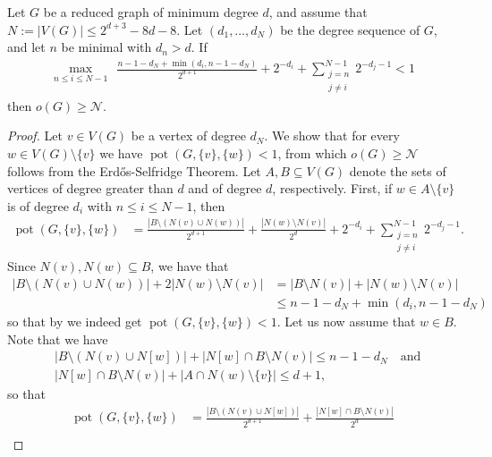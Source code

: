 \documentclass[10pt,a4paper]{amsart}
\DeclareMathOperator{\pot}{pot}
\begin{document}
\begin{lemma}\label{lemma:two_step_potential}
    Let $G$ be a reduced graph of minimum degree $d$, and assume that $N:=|V(G)| \leq 2^{d+3} - 8d - 8$. Let $(d_1,\dots,d_N)$ be the degree sequence of $G$, and let $n$ be minimal with $d_n > d$. If
    \begin{align}\label{align:two_step_potential}
        \max_{n \leq i \leq N-1}\ \ \frac{n-1-d_N+\min(d_i, n-1 - d_N)}{2^{d+1}}+ 2^{-d_i} + \sum_{\substack{j = n\\ j \neq i}}^{N-1} 2^{-d_j - 1} < 1
    \end{align}
    then $o(G) \geq \mathcal N$.
\end{lemma}

\begin{proof}
    Let $v \in V(G)$ be a vertex of degree $d_N$. We show that for every $w \in V(G) \setminus \{v\}$ we have $\pot(G, \{v\}, \{w\}) < 1$, from which $o(G) \geq \mathcal N$ follows from the Erd\H{o}s-Selfridge Theorem. Let $A,B \subseteq V(G)$ denote the sets of vertices of degree greater than $d$ and of degree $d$, respectively. First, if $w \in A \setminus \{v\}$ is of degree $d_i$ with $n \leq i \leq N-1$, then
    \begin{align*}
        \pot(G, \{v\}, \{w\}) &= \frac{|B \setminus (N(v) \cup N(w))|}{2^{d+1}}+\frac{|N(w) \setminus N(v)|}{2^{d}}+ 2^{-d_i} + \sum_{\substack{j = n \\ j \neq i}}^{N-1} 2^{-d_j - 1}.
    \end{align*}
    Since $N(v), N(w) \subseteq B$, we have that 
    \begin{align*}
        |B \setminus (N(v) \cup N(w))| + 2|N(w) \setminus N(v)| &= |B \setminus N(v)| + |N(w) \setminus N(v)| \\
        &\leq n-1-d_N + \min(d_i, n-1 - d_N)
    \end{align*}
    so that by  we indeed get $\pot(G,\{v\}, \{w\}) < 1$. Let us now assume that $w \in B$. Note that we have 
    \begin{align*}
        &|B \setminus (N(v) \cup N[w])| + |N[w] \cap B \setminus N(v)| \leq n-1-d_N \quad \text{and}  \\
        &|N[w] \cap B \setminus N(v)|+ |A \cap N(w) \setminus \{v\}| \leq d+1,
    \end{align*}
    so that
    \begin{align*}
        \pot(G, \{v\}, \{w\}) &= \frac{|B \setminus (N(v) \cup N[w])|}{2^{d+1}} + \frac{|N[w] \cap B \setminus N(v)|}{2^d}\\ 

\end{align*}
\end{proof}
\end{document}
